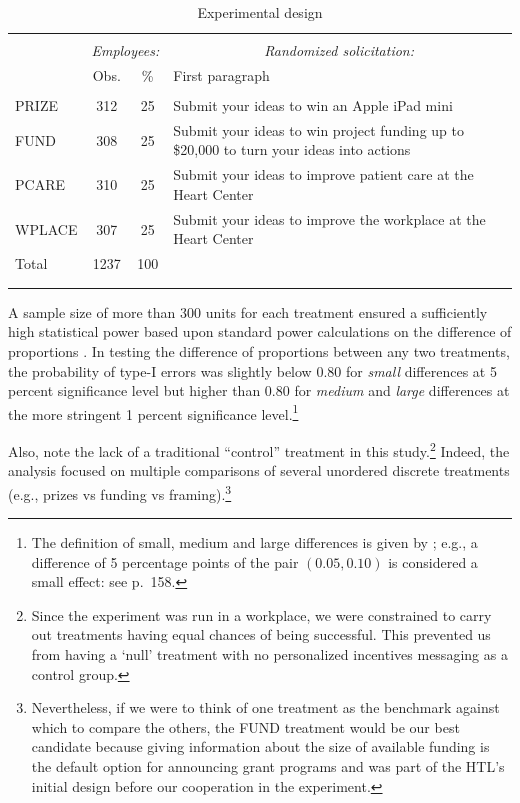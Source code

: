 \documentclass[11pt, titlepage]{article}
\begin{document}
\begin{table}
\centering
\caption{Experimental design}
\label{experimental-design}
\begin{tabular}{@{}lccp{10cm}}
  \\[-1.8ex]\hline \hline \\[-1.8ex]
 & \multicolumn{2}{c}{\emph{Employees:}}& \multicolumn{1}{c}{\emph{Randomized solicitation:}}\\
 \cmidrule(lr){2-3} & Obs. & \% & First paragraph \\ 
  \hline \\[-1.86ex]
PRIZE & 312 & 25 & Submit your ideas to win an Apple iPad mini \\ 
  [1.8ex] FUND & 308 & 25 & Submit your ideas to win project funding up to \$20,000 to turn your ideas into actions \\ 
  [1.8ex] PCARE & 310 & 25 & Submit your ideas to improve patient care at the Heart Center \\ 
  [1.8ex] WPLACE & 307 & 25 & Submit your ideas to improve the workplace at the Heart Center \\ 
  [1.8ex] Total & 1237 & 100 &  \\ 
   \\[-1.8ex]\hline \hline \\[-1.8ex]
\end{tabular}
\end{table}

A sample size of more than 300 units for each treatment ensured a
sufficiently high statistical power based upon standard power
calculations on the difference of proportions \citep{cohen1992power}. In
testing the difference of proportions between any two treatments, the
probability of type-I errors was slightly below \(0.80\) for
\emph{small} differences at 5 percent significance level but higher than
\(0.80\) for \emph{medium} and \emph{large} differences at the more
stringent 1 percent significance level.\footnote{The definition of
  small, medium and large differences is given by
  \citet{cohen1992power}; e.g., a difference of 5 percentage points of
  the pair \((0.05, 0.10)\) is considered a small effect: see
  \citet{cohen1992power} p.~158.}

Also, note the lack of a traditional ``control'' treatment in this
study.\footnote{Since the experiment was run in a workplace, we were
  constrained to carry out treatments having equal chances of being
  successful. This prevented us from having a `null' treatment with no
  personalized incentives messaging as a control group.} Indeed, the
analysis focused on multiple comparisons of several unordered discrete
treatments (e.g., prizes vs funding vs framing).\footnote{Nevertheless,
  if we were to think of one treatment as the benchmark against which to
  compare the others, the FUND treatment would be our best candidate
  because giving information about the size of available funding is the
  default option for announcing grant programs and was part of the HTL's
  initial design before our cooperation in the experiment.}
\end{document}
